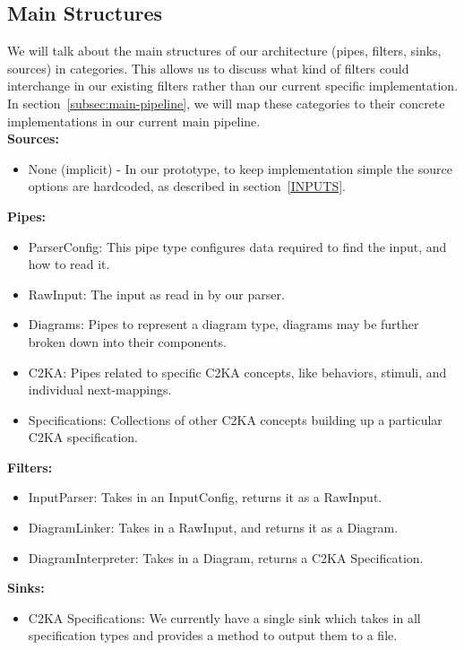 \documentclass[11pt]{article}
\begin{document}
    \subsection{Main Structures}\label{subsec:main-structures}
    We will talk about the main structures of our architecture (pipes, filters, sinks, sources) in categories.
    This allows us to discuss what kind of filters could interchange in our existing filters
    rather than our current specific implementation.
    In section~\ref{subsec:main-pipeline}, we will map these categories to their concrete implementations in our current main pipeline.\\
    \textbf{Sources:}
    \begin{itemize}
        \item None (implicit) - In our prototype, to keep implementation simple the source options
        are hardcoded, as described in section~\ref{INPUTS}.
    \end{itemize}
    \textbf{Pipes:}
    \begin{itemize}
        \item ParserConfig: This pipe type configures data required to find the input, and how to read it.
        \item RawInput: The input as read in by our parser.
        \item Diagrams: Pipes to represent a diagram type, diagrams may be further broken down into their components.
        \item C2KA: Pipes related to specific C2KA concepts, like behaviors, stimuli, and individual next-mappings.
        \item Specifications: Collections of other C2KA concepts building up a particular C2KA specification.
    \end{itemize}
    \textbf{Filters:}
    \begin{itemize}a
        \item InputParser: Takes in an InputConfig, returns it as a RawInput.
        \item DiagramLinker: Takes in a RawInput, and returns it as a Diagram.
        \item DiagramInterpreter: Takes in a Diagram, returns a C2KA Specification.
    \end{itemize}
    \textbf{Sinks:}
    \begin{itemize}
        \item C2KA Specifications: We currently have a single sink which takes in all specification types
        and provides a method to output them to a file.
    \end{itemize}
\end{document}
